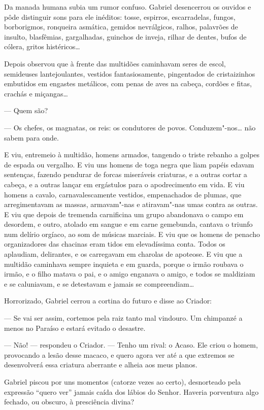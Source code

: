 Da manada humana subia um rumor confuso. Gabriel desencerrou os ouvidos
e pôde distinguir sons para ele inéditos: tosse, espirros, escarradelas,
fungos, borborigmos, ronqueira asmática, gemidos nevrálgicos, ralhos,
palavrões de insulto, blasfêmias, gargalhadas, guinchos de inveja,
rilhar de dentes, bufos de cólera, gritos histéricos\ldots{}

Depois observou que à frente das multidões caminhavam seres de escol,
semideuses lantejoulantes, vestidos fantasiosamente, pingentados de
cristaizinhos embutidos em engastes metálicos, com penas de aves na
cabeça, cordões e fitas, crachás e miçangas\ldots{}

--- Quem são?

--- Os chefes, os magnatas, os reis: os condutores de povos.
Conduzem"-nos\ldots{} não sabem para onde.

E viu, entremeio à multidão, homens armados, tangendo o triste rebanho a
golpes de espada ou vergalho. E viu uns homens de toga negra que liam
papéis edavam sentenças, fazendo pendurar de forcas miseráveis
criaturas, e a outras cortar a cabeça, e a outras lançar em ergástulos
para o apodrecimento em vida. E viu homens a cavalo, carnavalescamente
vestidos, empenachados de plumas, que arregimentavam as massas,
armavam"-nas e atiravam"-nas umas contra as outras. E viu que depois de
tremenda carnificina um grupo abandonava o campo em desordem, e outro,
atolado em sangue e em carne gemebunda, cantava o triunfo num delírio
orgíaco, ao som de músicas marciais. E viu que os homens de penacho
organizadores das chacinas eram tidos em elevadíssima conta. Todos os
aplaudiam, delirantes, e os carregavam em charolas de apoteose. E viu
que a multidão caminhava sempre inquieta e em guarda, porque o irmão
roubava o irmão, e o filho matava o pai, e o amigo enganava o amigo, e
todos se maldiziam e se caluniavam, e se detestavam e jamais se
compreendiam\ldots{}

Horrorizado, Gabriel cerrou a cortina do futuro e disse ao Criador:

--- Se vai ser assim, cortemos pela raiz tanto mal vindouro. Um
chimpanzé a menos no Paraíso e estará evitado o desastre.

--- Não! --- respondeu o Criador. --- Tenho um rival: o Acaso. Ele criou
o homem, provocando a lesão desse macaco, e quero agora ver até a que
extremos se desenvolverá essa criatura aberrante e alheia aos meus
planos.

Gabriel piscou por uns momentos (catorze vezes ao certo), desnorteado
pela expressão ``quero ver'' jamais caída dos lábios do Senhor. Haveria
porventura algo fechado, ou obscuro, à presciência divina?

